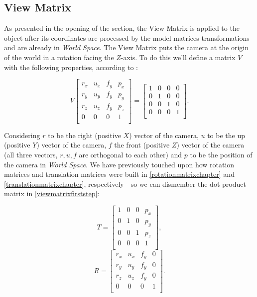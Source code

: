 \documentclass[cic,tc,english]{iiufrgs}
\begin{document}
\subsection{View Matrix}

As presented in the opening of the section, the View Matrix is applied to the object after its coordinates are processed by the model matrices transformations and are already in \textit{World Space}. The View Matrix puts the camera at the origin of the world in a rotation facing the $Z$-axis. To do this we'll define a matrix $V$ with the following properties, according to \citet{TwoDee2020}:

\begin{equation}
\label{viewmatrixfirststep}
    V
    \begin{bmatrix}
        r_x & u_x & f_y & p_x \\
        r_y & u_y & f_y & p_y \\
        r_z & u_z & f_y & p_z \\
        0   & 0   & 0   & 1   \\
    \end{bmatrix}
    =
    \begin{bmatrix}
        1 & 0 & 0 & 0 \\
        0 & 1 & 0 & 0 \\
        0 & 0 & 1 & 0 \\
        0 & 0 & 0 & 1 \\
    \end{bmatrix}
    .
\end{equation}

Considering $r$ to be the right (positive $X$) vector of the camera, $u$ to be the up (positive $Y$) vector of the camera, $f$ the front (positive $Z$) vector of the camera (all three vectors, $r,u,f$ are orthogonal to each other) and $p$ to be the position of the camera in \textit{World Space}. We have previously touched upon how rotation matrices and translation matrices were built in \cref{rotationmatrixchapter} and \cref{translationmatrixchapter}, respectively - so we can dismember the dot product matrix in  \cref{viewmatrixfirststep}:

\begin{equation}
    T
    =
    \begin{bmatrix}
        1 & 0 & 0 & p_x \\
        0 & 1 & 0 & p_y \\
        0 & 0 & 1 & p_z \\
        0 & 0 & 0 & 1   \\
    \end{bmatrix}
    ,
\end{equation}
\begin{equation}
    R
    =
    \begin{bmatrix}
        r_x & u_x & f_y & 0 \\
        r_y & u_y & f_y & 0 \\
        r_z & u_z & f_y & 0 \\
        0   & 0   & 0   & 1 \\
    \end{bmatrix}
    .
\end{equation}
\end{document}
